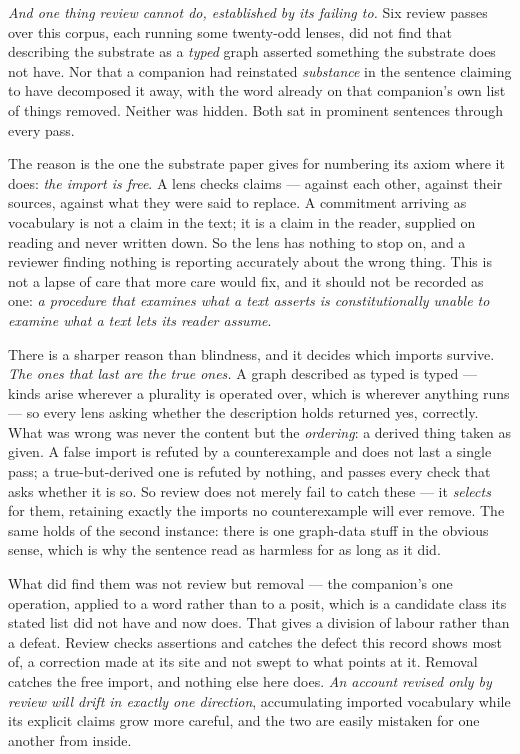\documentclass[11pt,a4paper]{article}
\theoremstyle{remark}\newtheorem{remark}[definition]{Remark}
\begin{document}
\emph{And one thing review cannot do, established by its failing to.} Six review passes over this
corpus, each running some twenty-odd lenses, did not find that describing the substrate as a
\emph{typed} graph asserted something the substrate does not have. Nor that a companion had reinstated
\emph{substance} in the sentence claiming to have decomposed it away, with the word already on that
companion's own list of things removed. Neither was hidden. Both sat in prominent sentences through
every pass.

The reason is the one the substrate paper gives for numbering its axiom where it does: \emph{the import
is free}. A lens checks claims --- against each other, against their sources, against what they were
said to replace. A commitment arriving as vocabulary is not a claim in the text; it is a claim in the
reader, supplied on reading and never written down. So the lens has nothing to stop on, and a reviewer
finding nothing is reporting accurately about the wrong thing. This is not a lapse of care that more
care would fix, and it should not be recorded as one: \emph{a procedure that examines what a text
asserts is constitutionally unable to examine what a text lets its reader assume}.

There is a sharper reason than blindness, and it decides which imports survive. \emph{The ones that
last are the true ones.} A graph described as typed is typed --- kinds arise wherever a plurality is
operated over, which is wherever anything runs --- so every lens asking whether the description holds
returned yes, correctly. What was wrong was never the content but the \emph{ordering}: a derived thing
taken as given. A false import is refuted by a counterexample and does not last a single pass; a
true-but-derived one is refuted by nothing, and passes every check that asks whether it is so. So
review does not merely fail to catch these --- it \emph{selects} for them, retaining exactly the
imports no counterexample will ever remove. The same holds of the second instance: there is one
graph-data stuff in the obvious sense, which is why the sentence read as harmless for as long as it did.

What did find them was not review but removal --- the companion's one operation, applied to a word
rather than to a posit, which is a candidate class its stated list did not have and now does. That
gives a division of labour rather than a defeat. Review checks assertions and catches the defect this
record shows most of, a correction made at its site and not swept to what points at it. Removal
catches the free import, and nothing else here does. \emph{An account revised only by review will drift
in exactly one direction}, accumulating imported vocabulary while its explicit claims grow more
careful, and the two are easily mistaken for one another from inside.
\end{document}

